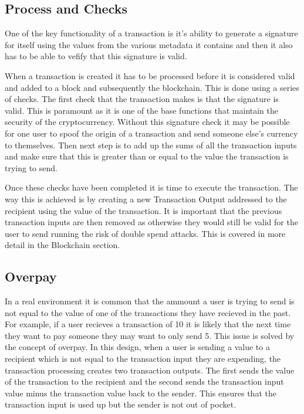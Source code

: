 \documentclass{l4proj}
\begin{document}
\subsection{Process and Checks}
One of the key functionality of a transaction is it's ability to generate a signature for itself using the values
from the various metadata it contains and then it also has to be able to vefify that this signature is valid.

When a transaction is created it has to be processed before it is considered valid and added to a block and subsequently
the blockchain. This is done using a series of checks. The first check that the transaction makes is that the
signature is valid. This is paramount as it is one of the base functions that maintain the security of the 
cryptocurrency. Without this signature check it may be possible for one user to spoof the origin of a transaction
and send someone else's currency to themselves. Then next step is to add up the sums of all the transaction inputs
and make sure that this is greater than or equal to the value the transaction is trying to send.

Once these checks have been completed it is time to execute the transaction. The way this is achieved is by
creating a new Transaction Output addressed to the recipient using the value of the transaction. It is important
that the previous transaction inputs are then removed as otherwise they would still be valid for the user to send
running the risk of double spend attacks. This is covered in more detail in the Blockchain section.

\subsection{Overpay}
In a real environment it is common that the ammount a user is trying to send is not equal to the value of one of
the transactions they have recieved in the past. For example, if a user recieves a transaction of 10 it is likely
that the next time they want to pay someone they may want to only send 5. This issue is solved by the concept of
overpay. In this design, when a user is sending a value to a recipient which is not equal to the transaction
input they are expending, the transaction processing creates two transaction outputs. The first sends the value
of the transaction to the recipient and the second sends the transaction input value minus the transaction value
back to the sender. This ensures that the transaction input is used up but the sender is not out of pocket.
\end{document}
